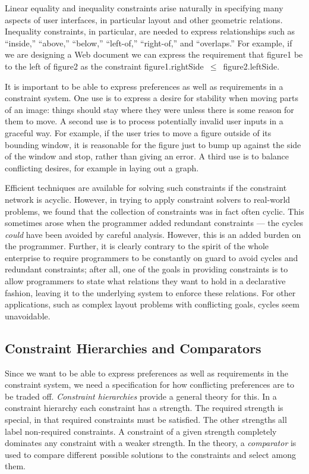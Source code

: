 \documentclass{uist96}
\newcommand{\code}{\small\sf}
\newcommand{\strength}{\rm}
\begin{document}
Linear equality and inequality constraints arise naturally in specifying
many aspects of user interfaces, in particular layout and other geometric
relations.  Inequality constraints, in particular, are needed to express
relationships such as ``inside,'' ``above,'' ``below,'' ``left-of,''
``right-of,'' and ``overlaps.''  For example, if we are designing a
Web document we can express the
requirement that {\code figure1} be to the left of {\code figure2} as the
constraint \mbox{\code figure1.rightSide $\leq$ figure2.leftSide}.

It is important to be able to express preferences as well as requirements
in a constraint system.  One use is to express a desire for stability
when moving parts of an image: things should stay where they were unless
there is some reason for them to move.  A second use is to process
potentially invalid user inputs in a graceful way.  For example, if the
user tries to move a figure outside of its bounding window, it is
reasonable for the figure just to bump up against the side of the window
and stop, rather than giving an error.  A
third use is to balance conflicting desires, for example in laying out a
graph.

Efficient techniques are available for solving such constraints if the
constraint network is acyclic.  However, in trying to apply constraint
solvers to real-world problems, we found that the collection of constraints
was in fact often cyclic.  This sometimes arose when the programmer
added redundant constraints --- the cycles {\em could} have been avoided by
careful analysis.  However, this is an added burden on the programmer.
Further, it is clearly contrary to the spirit of the whole enterprise to
require programmers to be constantly on guard to avoid cycles and redundant
constraints; after all, one of the goals in providing constraints is to
allow programmers to state what relations they want to hold in a
declarative fashion, leaving it to the underlying system to enforce these
relations.  For other applications, such as complex layout problems with
conflicting goals,  cycles seem unavoidable.

\subsection{Constraint Hierarchies and Comparators}

Since we want to be able to express preferences as well as requirements in
the constraint system, we need a specification for how conflicting
preferences are to be traded off.  {\em Constraint hierarchies}
\cite{borning-lisp-symbolic-computation-92} provide a general theory for
this.  In a constraint hierarchy each constraint has a strength.  The
{\strength required} strength is special, in that {\strength required}
constraints must be satisfied.  The other strengths all label non-required
constraints.  A constraint of a given strength completely dominates any
constraint with a weaker strength.  In the theory, a {\em comparator} is
used to compare different possible solutions to the constraints and select
among them.
\end{document}
